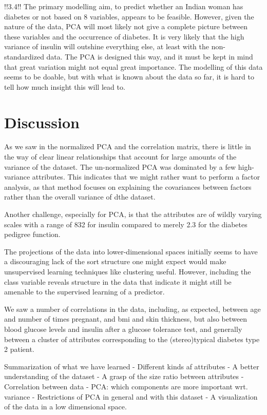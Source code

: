 !!3.4!!
The primary modelling aim, to predict whether an Indian woman has diabetes or not
based on 8 variables, appears to be feasible. However, given the nature of the
data, PCA will most likely not give a complete picture between these variables
and the occurrence of diabetes. It is very likely that the high variance of
insulin will outshine everything else, at least with the non-standardized
data. The PCA is designed this way, and it must be kept in mind that great
variation might not equal great importance.
The modelling of this data seems to be doable, but with what is known about the data
so far, it is hard to tell how much insight this will lead to.

\section{Discussion}
As we saw in the normalized PCA and the correlation matrix,
there is little in the way of clear
linear relationships that account for 
large amounts of the variance of the dataset.
The un-normalized PCA was dominated by a few high-variance attributes.
This indicates that we might rather want to perform a factor analysis,
as that method focuses on explaining the covariances between factors rather
than the overall variance of dthe dataset.

Another challenge,
especially for PCA,
is that the attributes are of wildly varying scales
with a range of 832 for insulin compared to merely 2.3
for the diabetes pedigree function.

The projections of the data into lower-dimensional spaces
initially seems to have a discouraging lack of the sort structure
one might expect would make unsupervised learning techniques like clustering useful.
However, including the class variable reveals structure in the data
that indicate it might still be amenable to
the supervised learning of a predictor.

We saw a number of correlations in the data,
including, as expected,
between age and number of times pregnant,
and bmi and skin thickness,
but also between blood glucose levels and insulin after a glucose tolerance test,
and generally between a cluster of attributes corresponding to
the (stereo)typical diabetes type 2 patient.


Summarization of what we have learned
- Different kinds af attributes
- A better understanding of the dataset
- A grasp of the size ratio between attributes
- Correlation between data
- PCA: which components are more important wrt. variance
- Restrictions of PCA in general and with this dataset
- A visualization of the data in a low dimensional space.

